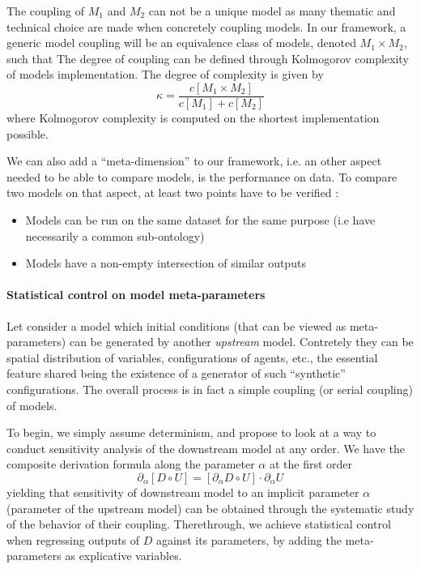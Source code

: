 The coupling of $M_1$ and $M_2$ can not be a unique model as many thematic and technical choice are made when concretely coupling models. In our framework, a generic model coupling will be an equivalence class of models, denoted $M_1 \times M_2$, such that 
The degree of coupling can be defined through Kolmogorov complexity of models implementation. The degree of complexity is given by
\[
\kappa = \frac{c[M_1 \times M_2]}{c[M_1] + c[M_2]}
\]
where Kolmogorov complexity is computed on the shortest implementation possible.


We can also add a ``meta-dimension'' to our framework, i.e. an other aspect needed to be able to compare models, is the performance on data. To compare two models on that aspect, at least two points have to be verified :
\begin{itemize}
\item Models can be run on the same dataset for the same purpose (i.e have necessarily a common sub-ontology)
\item Models have a non-empty intersection of similar outputs
\end{itemize}



\paragraph{Statistical control on model meta-parameters}

Let consider a model which initial conditions (that can be viewed as meta-parameters) can be generated by another \emph{upstream} model. Contretely they can be spatial distribution of variables, configurations of agents, etc., the essential feature shared being the existence of a generator of such ``synthetic'' configurations. The overall process is in fact a simple coupling (or serial coupling) of models.

To begin, we simply assume determinism, and propose to look at a way to conduct sensitivity analysis of the downstream model at any order. We have the composite derivation formula along the parameter $\alpha$ at the first order
\[
\partial_{\alpha}[D \circ U] = [\partial_{\alpha} D \circ U ]\cdot \partial_{\alpha} U
\]
yielding that sensitivity of downstream model to an implicit parameter $\alpha$ (parameter of the upstream model) can be obtained through the systematic study of the behavior of their coupling. Therethrough, we achieve statistical control when regressing outputs of $D$ against its parameters, by adding the meta-parameters as explicative variables.

